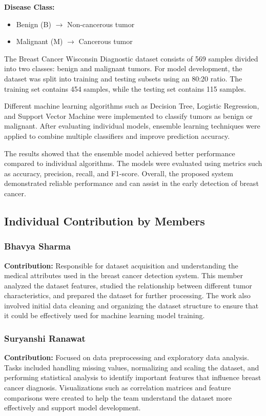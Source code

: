 \documentclass[12pt]{article}
\begin{document}
\vspace{0.5cm}

\noindent \textbf{Disease Class:}
\begin{itemize}
    \item Benign (B) $\rightarrow$ Non-cancerous tumor
    \item Malignant (M) $\rightarrow$ Cancerous tumor
\end{itemize}

The Breast Cancer Wisconsin Diagnostic dataset consists of 569 samples divided into two classes: benign and malignant tumors. For model development, the dataset was split into training and testing subsets using an 80:20 ratio. The training set contains 454 samples, while the testing set contains 115 samples.

Different machine learning algorithms such as Decision Tree, Logistic Regression, and Support Vector Machine were implemented to classify tumors as benign or malignant. After evaluating individual models, ensemble learning techniques were applied to combine multiple classifiers and improve prediction accuracy.

The results showed that the ensemble model achieved better performance compared to individual algorithms. The models were evaluated using metrics such as accuracy, precision, recall, and F1-score. Overall, the proposed system demonstrated reliable performance and can assist in the early detection of breast cancer.

\subsection{Individual Contribution by Members}

\subsubsection*{Bhavya Sharma}
\textbf{Contribution:} Responsible for dataset acquisition and understanding the medical attributes used in the breast cancer detection system. This member analyzed the dataset features, studied the relationship between different tumor characteristics, and prepared the dataset for further processing. The work also involved initial data cleaning and organizing the dataset structure to ensure that it could be effectively used for machine learning model training.

\subsubsection*{Suryanshi Ranawat}
\textbf{Contribution:} Focused on data preprocessing and exploratory data analysis. Tasks included handling missing values, normalizing and scaling the dataset, and performing statistical analysis to identify important features that influence breast cancer diagnosis. Visualizations such as correlation matrices and feature comparisons were created to help the team understand the dataset more effectively and support model development.
\end{document}
